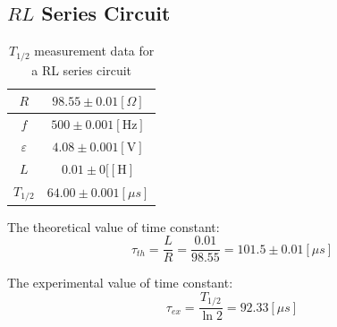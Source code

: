 \documentclass[12pt]{article}
\begin{document}
\subsection{$RL$ Series Circuit}
\begin{table}[H]
\centering
\begin{tabular}{|c|c|}
\hline
$R$&$98.55\pm0.01[\Omega]$\\ \hline
$f$&$500\pm0.001[\mathrm{Hz}]$\\ \hline
$\varepsilon$&$4.08\pm0.001[\mathrm{V}]$\\ \hline
$L$&$0.01\pm0[\mathrm{[H]}$\\ \hline
$T_{1/2}$&$64.00\pm0.001[\mu s]$\\ \hline
\end{tabular}
\caption{$T_{1/2}$ measurement data for a RL series circuit}
\end{table}
The theoretical value of time constant:
$$\tau_{th}=\frac{L}{R}=\frac{0.01}{98.55}=101.5\pm0.01[\mu s]$$
\par The experimental value of time constant:
$$\tau_{ex}=\frac{T_{1/2}}{\ln2}=92.33[\mu s]$$
\end{document}
